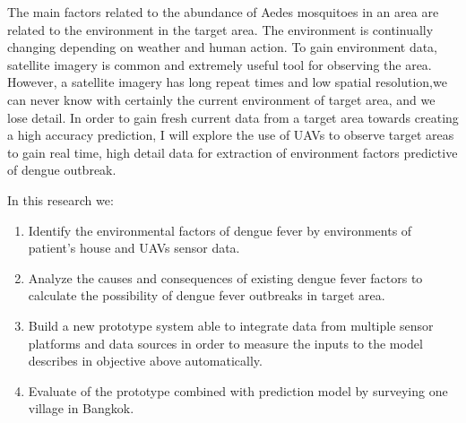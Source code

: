 \documentclass[review]{elsarticle}
\begin{document}
The main factors related to the abundance of Aedes mosquitoes in an area are related to the environment in the target area. The environment is continually changing depending on weather and human action. To gain  environment data, satellite imagery  is common and extremely useful tool for observing the area. However, a satellite imagery has long repeat times and low spatial resolution,we can never know with certainly the current environment of target area, and we lose detail. In order to gain fresh current data from a target area towards creating a high accuracy prediction, I will explore the use of UAVs to observe target areas to gain real time, high detail data for extraction of environment factors predictive of dengue outbreak.
	
	
In this research we: 
	
	\begin{enumerate}
		\item Identify the environmental factors of dengue fever by environments of patient’s house and UAVs sensor data.
		
		\item Analyze the causes and consequences of existing dengue fever factors to calculate the possibility of dengue fever outbreaks in target area. 
		
		\item Build a new prototype system able to integrate data from multiple sensor platforms and data sources in order to measure the inputs to the model describes in objective above automatically. 
		
		\item Evaluate of the prototype combined with prediction model by surveying one village in Bangkok.
	\end{enumerate}
	
\end{document}

